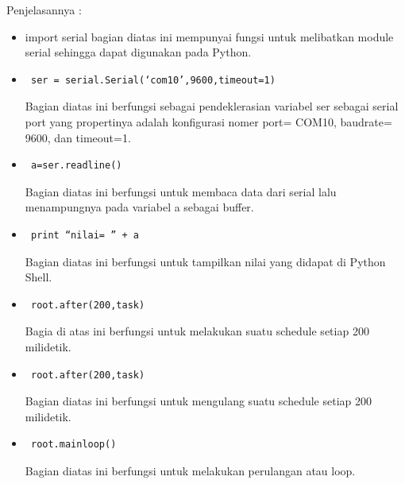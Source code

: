 		Penjelasannya : 
		\begin{itemize}
			\item import serial
			bagian diatas ini mempunyai fungsi untuk melibatkan module serial sehingga dapat digunakan pada Python.
			
			\item \begin{verbatim} ser = serial.Serial(‘com10’,9600,timeout=1)\end{verbatim}
			Bagian diatas ini berfungsi sebagai pendeklerasian variabel ser sebagai serial port yang propertinya adalah konfigurasi nomer port= COM10, baudrate= 9600, dan timeout=1.
			\item \begin{verbatim} a=ser.readline() \end{verbatim}
			Bagian diatas ini berfungsi untuk membaca data dari serial lalu menampungnya pada variabel a sebagai buffer.
			\item \begin{verbatim} print “nilai= ” + a \end{verbatim} 
			Bagian diatas ini berfungsi untuk tampilkan nilai yang didapat di Python Shell. 
			\item \begin{verbatim} root.after(200,task) \end{verbatim}
			Bagia di atas ini berfungsi untuk melakukan suatu schedule setiap 200 milidetik.
			\item \begin{verbatim} root.after(200,task)	\end{verbatim}
			Bagian diatas ini berfungsi untuk mengulang suatu schedule setiap 200 milidetik.
			\item \begin{verbatim} root.mainloop() \end{verbatim}
			Bagian diatas ini berfungsi untuk melakukan perulangan atau loop.
		\end{itemize}
	
	\cite{nurjanahhack}
	\cite{rossum1995python}

